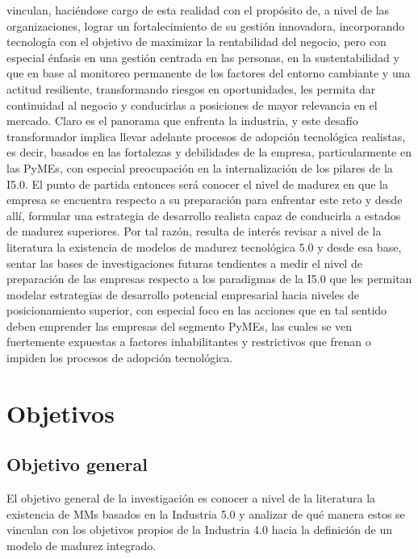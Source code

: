 \documentclass{article}
\begin{document}
vinculan, haciéndose cargo de esta realidad con el propósito de, a nivel
de las organizaciones, lograr un fortalecimiento de su gestión
innovadora, incorporando tecnología con el objetivo de maximizar la
rentabilidad del negocio, pero con especial énfasis en una gestión
centrada en las personas, en la sustentabilidad y que en base al
monitoreo permanente de los factores del entorno cambiante y una actitud
resiliente, transformando riesgos en oportunidades, les permita dar
continuidad al negocio y conducirlas a posiciones de mayor relevancia en
el mercado. Claro es el panorama que enfrenta la industria, y este
desafío transformador implica llevar adelante procesos de adopción
tecnológica realistas, es decir, basados en las fortalezas y debilidades
de la empresa, particularmente en las PyMEs, con especial preocupación
en la internalización de los pilares de la I5.0. El punto de partida
entonces será conocer el nivel de madurez en que la empresa se encuentra
respecto a su preparación para enfrentar este reto y desde allí,
formular una estrategia de desarrollo realista capaz de conducirla a
estados de madurez superiores. Por tal razón, resulta de interés revisar
a nivel de la literatura la existencia de modelos de madurez tecnológica
5.0 y desde esa base, sentar las bases de investigaciones futuras
tendientes a medir el nivel de preparación de las empresas respecto a
los paradigmas de la I5.0 que les permitan modelar estrategias de
desarrollo potencial empresarial hacia niveles de posicionamiento
superior, con especial foco en las acciones que en tal sentido deben
emprender las empresas del segmento PyMEs, las cuales se ven fuertemente
expuestas a factores inhabilitantes y restrictivos que frenan o impiden
los procesos de adopción tecnológica.

\section{Objetivos}\label{objetivos}

\subsection{Objetivo general}\label{objetivo-general}

El objetivo general de la investigación es conocer a nivel de la
literatura la existencia de MMs basados en la Industria 5.0 y analizar
de qué manera estos se vinculan con los objetivos propios de la
Industria 4.0 hacia la definición de un modelo de madurez integrado.
\end{document}
